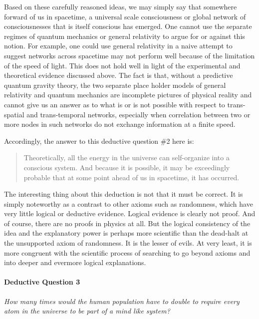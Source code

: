\documentclass[submission,copyright,creativecommons]{eptcs}
\begin{document}
Based on these carefully reasoned ideas, we may simply say that somewhere forward of us in spacetime, a universal scale consciousness or global network of consciousnesses that is itself conscious has emerged. One cannot use the separate regimes of quantum mechanics or general relativity to argue for or against this notion. For example, one could use general relativity in a naive attempt to suggest networks across spacetime may not perform well because of the limitation of the speed of light. This does not hold well in light of the experimental and theoretical evidence discussed above. The fact is that, without a predictive quantum gravity theory, the two separate place holder models of general relativity and quantum mechanics are incomplete pictures of physical reality and cannot give us an answer as to what is or is not possible with respect to trans-spatial and trans-temporal networks, especially when correlation between two or more nodes in such networks do not exchange information at a finite speed. 

Accordingly, the answer to this deductive question \#2 here is:

\begin{quote}Theoretically, all the energy in the universe can self-organize into a conscious system. And because it is possible, it may be exceedingly probable that at some point ahead of us in spacetime, it has occurred.
\source{}
\end{quote}

The interesting thing about this deduction is not that it must be correct. It is simply noteworthy as a contrast to other axioms such as randomness, which have very little logical or deductive evidence. Logical evidence is clearly not proof. And of course, there are no proofs in physics at all. But the logical consistency of the idea and the explanatory power is perhaps more scientific than the dead-halt at the unsupported axiom of randomness. It is the lesser of evils. At very least, it is more congruent with the scientific process of searching to go beyond axioms and into deeper and evermore logical explanations.


\paragraph{\textbf{Deductive Question 3}}

\textit{How many times would the human population have to double to require every atom in the universe to be part of a mind like system?}\hfill\break
\end{document}
